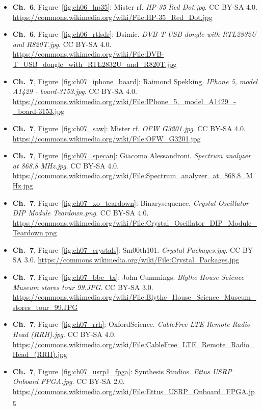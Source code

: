 \begin{small}
\begin{itemize}[leftmargin=0pt,itemsep=2pt,label={}]
\item \textbf{Ch.~6}, Figure~\ref{fig:ch06_hp35}: Mister rf. \emph{HP-\allowbreak{}35 Red Dot.\allowbreak{}jpg}. CC BY-SA 4.0. \url{https://commons.wikimedia.org/wiki/File:HP-35_Red_Dot.jpg}
\item \textbf{Ch.~6}, Figure~\ref{fig:ch06_rtlsdr}: Dsimic. \emph{DVB-\allowbreak{}T USB dongle with RTL2832U and R820T.\allowbreak{}jpg}. CC BY-SA 4.0. \url{https://commons.wikimedia.org/wiki/File:DVB-T_USB_dongle_with_RTL2832U_and_R820T.jpg}
\item \textbf{Ch.~7}, Figure~\ref{fig:ch07_iphone_board}: Raimond Spekking. \emph{IPhone 5, model A1429 -\allowbreak{} board-\allowbreak{}3153.\allowbreak{}jpg}. CC BY-SA 4.0. \url{https://commons.wikimedia.org/wiki/File:IPhone_5,_model_A1429_-_board-3153.jpg}
\item \textbf{Ch.~7}, Figure~\ref{fig:ch07_saw}: Mister rf. \emph{OFW G3201.\allowbreak{}jpg}. CC BY-SA 4.0. \url{https://commons.wikimedia.org/wiki/File:OFW_G3201.jpg}
\item \textbf{Ch.~7}, Figure~\ref{fig:ch07_specan}: Giacomo Alessandroni. \emph{Spectrum analyzer at 868.\allowbreak{}8 MHz.\allowbreak{}jpg}. CC BY-SA 4.0. \url{https://commons.wikimedia.org/wiki/File:Spectrum_analyzer_at_868.8_MHz.jpg}
\item \textbf{Ch.~7}, Figure~\ref{fig:ch07_xo_teardown}: Binarysequence. \emph{Crystal Oscillator DIP Module Teardown.\allowbreak{}png}. CC BY-SA 4.0. \url{https://commons.wikimedia.org/wiki/File:Crystal_Oscillator_DIP_Module_Teardown.png}
\item \textbf{Ch.~7}, Figure~\ref{fig:ch07_crystals}: Sm00th101. \emph{Crystal Packages.\allowbreak{}jpg}. CC BY-SA 3.0. \url{https://commons.wikimedia.org/wiki/File:Crystal_Packages.jpg}
\item \textbf{Ch.~7}, Figure~\ref{fig:ch07_bbc_tx}: John Cummings. \emph{Blythe House Science Museum stores tour 99.\allowbreak{}JPG}. CC BY-SA 3.0. \url{https://commons.wikimedia.org/wiki/File:Blythe_House_Science_Museum_stores_tour_99.JPG}
\item \textbf{Ch.~7}, Figure~\ref{fig:ch07_rrh}: OxfordScience. \emph{CableFree LTE Remote Radio Head (RRH).\allowbreak{}jpg}. CC BY-SA 4.0. \url{https://commons.wikimedia.org/wiki/File:CableFree_LTE_Remote_Radio_Head_(RRH).jpg}
\item \textbf{Ch.~7}, Figure~\ref{fig:ch07_usrp1_fpga}: Synthesis Studios. \emph{Ettus USRP Onboard FPGA.\allowbreak{}jpg}. CC BY-SA 2.0. \url{https://commons.wikimedia.org/wiki/File:Ettus_USRP_Onboard_FPGA.jpg}

\end{itemize}
\end{small}
